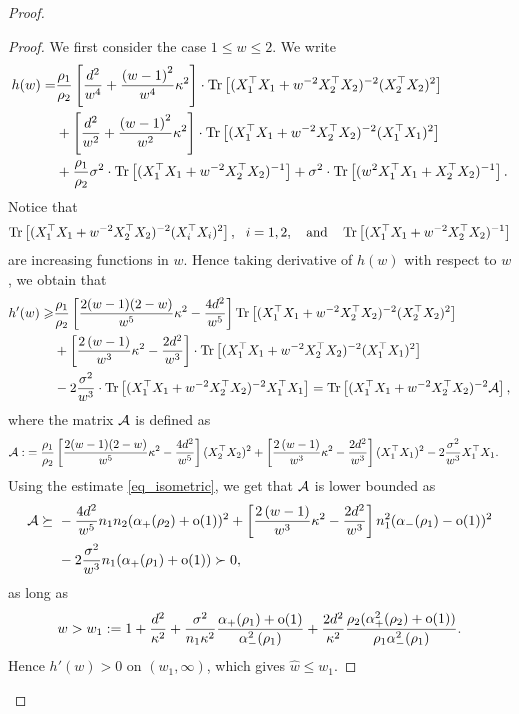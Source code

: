 \begin{proof}
\begin{proof}
We first consider the case $1\le w\le 2$. We write
\begin{align}
	h(w) =&  \frac{\rho_1}{\rho_2}\left[\frac{d^2}{w^4} +\frac{\left( w-1\right)^2}{w^4}\kappa^2\right]\cdot \tr\left[( X_1^{\top}X_1 +w^{-2}X_2^{\top}X_2)^{-2} (X_2^{\top}X_2)^2\right] \nonumber \\
	& + \left[\frac{d^2}{w^2} +\frac{\left( w-1\right)^2}{w^2}\kappa^2\right]\cdot \tr\left[( X_1^{\top}X_1 +w^{-2}X_2^{\top}X_2)^{-2} (X_1^{\top}X_1)^2\right] \nonumber\\
			& +  \frac{\rho_1}{\rho_2}\sigma^2  \cdot \bigtr{(X_1^{\top}X_1  + w^{-2}X_2^{\top}X_2)^{-1} }+ \sigma^2 \cdot \bigtr{(w^2X_1^{\top}X_1  + X_2^{\top}X_2)^{-1} }.\nonumber%
\end{align}
Notice that
$$\tr\left[( X_1^{\top}X_1 +w^{-2}X_2^{\top}X_2)^{-2} (X_i^{\top}X_i)^2\right],\ \ i=1,2, \quad \text{and} \quad \bigtr{(X_1^{\top}X_1  + w^{-2}X_2^{\top}X_2)^{-1} }$$
are increasing functions in $w$. Hence taking derivative of $h(w)$ with respect to $w$, we obtain that
\begin{align*}
h'(w) \ge & \frac{\rho_1}{\rho_2}\left[ \frac{2(w-1)(2-w)}{w^5}\kappa^2 - \frac{4d^2}{w^5}\right] \tr\left[( X_1^{\top}X_1 +w^{-2}X_2^{\top}X_2)^{-2} (X_2^{\top}X_2)^2\right]   \\
 &+ \left[\frac{2\left( w-1\right)}{w^3}\kappa^2 - \frac{2d^2}{w^3} \right]\cdot \tr\left[( X_1^{\top}X_1 +w^{-2}X_2^{\top}X_2)^{-2} (X_1^{\top}X_1)^2\right] \nonumber\\
		&- 2  \frac{\sigma^2}{w^3} \cdot \bigtr{(X_1^{\top}X_1 + w^{-2}X_2^{\top}X_2)^{-2} X_1^\top X_1  } =  \bigtr{(X_1^{\top}X_1 + w^{-2}X_2^{\top}X_2)^{-2} \cal A },
\end{align*}
where the matrix $\cal A$ is defined as 
\begin{align*}
\cal A :&= \frac{\rho_1}{\rho_2}\left[ \frac{2(w-1)(2-w)}{w^5}\kappa^2 - \frac{4d^2}{w^5}\right](X_2^{\top}X_2)^2 + \left[\frac{2\left( w-1\right)}{w^3}\kappa^2 - \frac{2d^2}{w^3} \right](X_1^{\top}X_1)^2 - 2 \frac{\sigma^2}{w^3}X_1^\top X_1.
\end{align*}
Using the estimate \eqref{eq_isometric}, we get that $\cal A$ is lower bounded as
\begin{align*}
\cal A \succeq&~ - \frac{4d^2}{w^5}n_1n_2 (\al_+(\rho_2)+\oo(1))^2 + \left[\frac{2\left( w-1\right)}{w^3}\kappa^2 - \frac{2d^2}{w^3} \right]n_1^2 (\al_-(\rho_1)-\oo(1))^2 \\
&~ - 2 \frac{\sigma^2}{w^3}n_1(\al_{+}(\rho_1)+\oo(1)) \succ 0,
\end{align*}
as long as
$$w> w_1:=1 +\frac{d^2}{\kappa^2}+ \frac{\sigma^2}{n_1\kappa^2}\frac{\al_{+}(\rho_1)+\oo(1)}{\al_{-}^2(\rho_1)} + \frac{2d^2}{\kappa^2}\frac{\rho_2(\al_+^2(\rho_2)+\oo(1))}{\rho_1\al_-^2(\rho_1) }.$$
Hence $h'(w)>0$ on $(w_1,\infty)$, %
which gives $\hat w\le w_1$.


\end{proof}
\end{proof}
